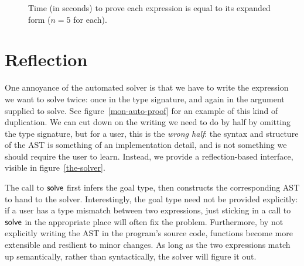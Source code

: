 \documentclass[draft, twocolumn]{article}
\theoremstyle{definition}
\theoremstyle{definition}
\begin{document}
\begin{figure}[H]
  \setcounter{realxtickpos}{0}
  \begin{subfigure}[h]{\linewidth}
    \label{bench3}
  \end{subfigure}

  \caption{Time (in seconds) to prove each expression is equal to its expanded
    form ($n = 5$ for each).}
  \label{benchmarks}
\end{figure}
\section{Reflection} \label{reflection}
One annoyance of the automated solver is that we have to write the expression we
want to solve twice: once in the type signature, and again in the argument
supplied to solve. See figure~\ref{mon-auto-proof} for an example of this kind
of duplication. We can cut down on the writing we need to do by half by omitting
the type signature, but for a user, this is the \emph{wrong half}: the syntax
and structure of the AST is something of an implementation detail, and is not
something we should require the user to learn. Instead, we provide a
reflection-based interface, visible in figure~\ref{the-solver}.

The call to \(\AgdaMacro{solve}\) first infers the goal type, then constructs
the corresponding AST to hand to the solver. Interestingly, the goal type need
not be provided explicitly: if a user has a type mismatch between two
expressions, just sticking in a call to \(\AgdaMacro{solve}\) in the appropriate
place will often fix the problem. Furthermore, by not explicitly writing the AST
in the program's source code, functions become more extensible and resilient to
minor changes. As long as the two expressions match up semantically, rather than
syntactically, the solver will figure it out.
\end{document}
